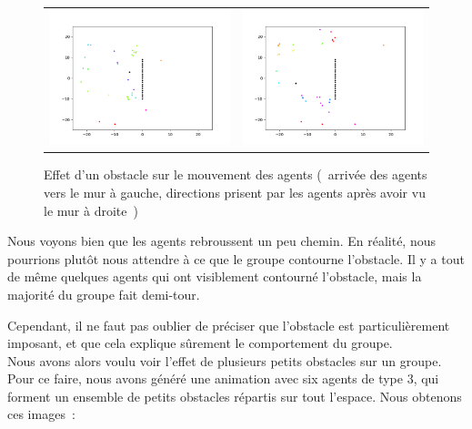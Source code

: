 \documentclass[french, a4paper, 12pt, openany]{report}
\begin{document}
    
	\begin{figure}[!h]
		\centering
		\begin{tabular}{cc}
			\includegraphics[width=8cm]{images/image_19.png} & \includegraphics[width=8cm]{images/image_18.png} \\
		\end{tabular}
		\caption{Effet d'un obstacle sur le mouvement des agents (~arrivée des agents vers le mur à gauche, directions prisent par les agents après avoir vu le mur à droite~)}
		\label{obstacles}
	\end{figure}

	Nous voyons bien que les agents rebroussent un peu chemin. En réalité, nous pourrions plutôt nous attendre à ce que le groupe contourne l'obstacle. Il y a tout de même quelques agents qui ont visiblement contourné l'obstacle, mais la majorité du groupe fait demi-tour.
	
	Cependant, il ne faut pas oublier de préciser que l'obstacle est particulièrement imposant, et que cela explique sûrement le comportement du groupe.\\
	
	Nous avons alors voulu voir l'effet de plusieurs petits obstacles sur un groupe. Pour ce faire, nous avons généré une animation avec six agents de type 3, qui forment un ensemble de petits obstacles répartis sur tout l'espace. Nous obtenons ces images~:
	
\end{document}
